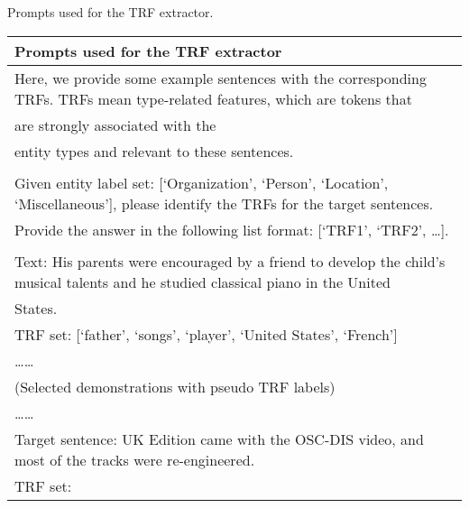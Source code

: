 \begin{prompt*}[t]
	\centering
	\caption{Prompts used for the \ac{TRF} extractor.}
	\label{tab:TRF-extractor-chapter5}
	\begin{tabular}{l}
		\toprule
        Prompts used for the TRF extractor \\
        \midrule
        Here, we provide some example sentences with the corresponding TRFs.
        TRFs mean type-related features,  which are tokens that \\ are strongly associated with the \\ entity types and relevant to these sentences. \\ \\
        Given entity label set: {[}`Organization', `Person', `Location',  `Miscellaneous'{]}, please identify the TRFs for the target sentences.
        \\ Provide the answer in the following list format: {[}`TRF1', `TRF2', \ldots{]}. \\
        \\
        Text: His parents were encouraged by a friend to develop the child's musical talents and he studied classical piano in the United \\ States.\\
        TRF set: [`father', `songs', `player', `United States', `French'] \\
        \ldots\ldots\\
        (Selected demonstrations with pseudo TRF labels)\\
        \ldots\ldots\\
        Target sentence: UK Edition came with the OSC-DIS video, and most of the tracks were re-engineered.\\
        TRF set: \\
        \bottomrule
	\end{tabular}
\end{prompt*}

